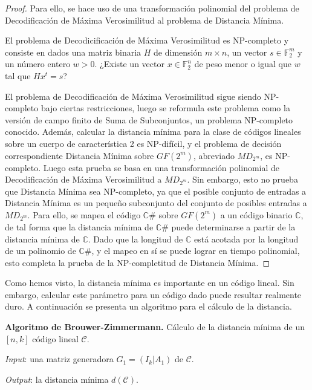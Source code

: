 \begin{proof}
    Para ello, se hace uso de una transformación polinomial del problema de Decodificación de Máxima Verosimilitud al problema de Distancia Mínima.

    El problema de Decodicificación de Máxima Verosimilitud es NP-completo y consiste en dados una matriz binaria $H$ de dimensión $m \times n$, un vector $s \in \mathbb{F}_2^m$ y un número entero $w > 0$. ¿Existe un vector $x \in \mathbb{F}_2^n$ de peso menor o igual que $w$ tal que $Hx^t = s$?

    El problema de Decodificación de Máxima Verosimilitud sigue siendo NP-completo bajo ciertas restricciones, luego se reformula este problema como la versión de campo finito de Suma de Subconjuntos, un problema NP-completo conocido. Además, calcular la distancia mínima para la clase de códigos lineales sobre un cuerpo de característica 2 es NP-difícil, y el problema de decisión correspondiente Distancia Mínima sobre $GF(2^m)$, abreviado $MD_{2^m}$, es NP-completo. Luego esta prueba se basa en una transformación polinomial de Decodificación de Máxima Verosimilitud a $MD_{2^m}$. Sin embargo, esto no prueba que Distancia Mínima sea NP-completo, ya que el posible conjunto de entradas a Distancia Mínima es un pequeño subconjunto del conjunto de posibles entradas a $MD_{2^m}$. Para ello, se mapea el código $\mathbb{C\#}$ sobre $GF(2^m)$ a un código binario $\mathbb{C}$, de tal forma que la distancia mínima de $\mathbb{C\#}$ puede determinarse a partir de la distancia mínima de $\mathbb{C}$. Dado que la longitud de $\mathbb{C}$ está acotada por la longitud de un polinomio de $\mathbb{C\#}$, y el mapeo en sí se puede lograr en tiempo polinomial, esto completa la prueba de la NP-completitud de Distancia Mínima.
\end{proof}


Como hemos visto, la distancia mínima es importante en un código lineal. Sin embargo, calcular este parámetro para un código dado puede resultar realmente duro. A continuación se presenta un algoritmo para el cálculo de la distancia.

\textbf{Algoritmo de Brouwer-Zimmermann.} Cálculo de la distancia mínima de un $[n,k]$ código lineal $\mathcal{C}$.

\emph{Input}: una matriz generadora $G_1 = (I_k | A_1)$ de $\mathcal{C}$.

\emph{Output}: la distancia mínima $d(\mathcal{C})$.

